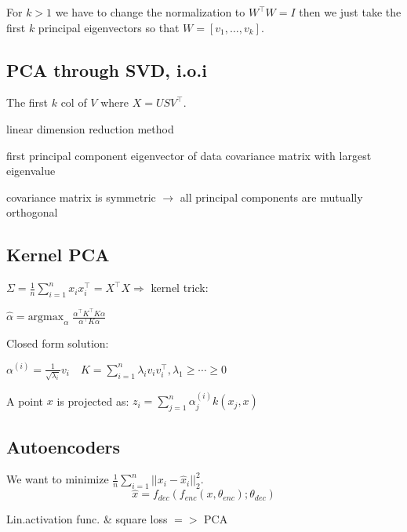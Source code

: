 For $k > 1$ we have to change the normalization to $W^\top W = I$ then we just take the first $k$ principal eigenvectors so that $W = [v_1, \ldots, v_k]$.

\subsection*{PCA through SVD, i.o.i}
\begin{compactitem}
	\item The first $k$ col of $V$ where $X = U S V^\top$.
	\item linear dimension reduction method
	\item first principal component eigenvector of data covariance matrix with largest eigenvalue
	\item covariance matrix is symmetric $\rightarrow$ all principal components are mutually orthogonal
\end{compactitem}	

\subsection*{Kernel PCA}

$\Sigma = \frac{1}{n} \sum_{i=1}^n x_i x_i^\top = X^\top X \Rightarrow$  kernel trick:

\qquad \qquad $\hat{\alpha} = \text{argmax}_\alpha \; \frac{\alpha^\top K^\top K \alpha}{\alpha^\top K \alpha}$

Closed form solution:

$\alpha^{(i)} = \frac{1}{\sqrt{\lambda_i}}v_i \quad K = \sum_{i = 1}^n \lambda_i v_i v_i^\top, \lambda_1 \geq \cdots \geq 0$

A point $x$ is projected as:
$z_i = \sum_{j=1}^n \alpha_j^{(i)} k(x_j, x)$

\subsection*{Autoencoders}

We want to minimize $\frac{1}{n}\sum_{i=1}^n ||x_i - \hat{x}_i||_2^2$.
\[
	\hat{x} = f_{dec}(f_{enc}(x, \theta_{enc}); \theta_{dec})
\]

Lin.activation func. \& square loss $=>$ PCA
